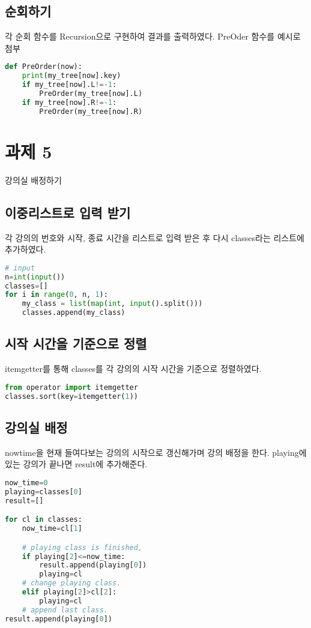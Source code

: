 \documentclass{article}
\begin{document}
	\subsection{순회하기}
	 각 순회 함수를 Recursion으로 구현하여 결과를 출력하였다.
	PreOder 함수를 예시로 첨부
	\begin{lstlisting}[language=Python]
def PreOrder(now):
	print(my_tree[now].key)
	if my_tree[now].L!=-1:
		PreOrder(my_tree[now].L)
	if my_tree[now].R!=-1:
		PreOrder(my_tree[now].R)
	\end{lstlisting}

	\section{과제 5}
	강의실 배정하기
	\subsection{이중리스트로 입력 받기}
	각 강의의 번호와 시작, 종료 시간을 리스트로 입력 받은 후 다시 classes라는 리스트에 추가하였다.
	\begin{lstlisting}[language=Python]
# input
n=int(input())
classes=[]
for i in range(0, n, 1):
	my_class = list(map(int, input().split()))
	classes.append(my_class)
	\end{lstlisting}
	\subsection{시작 시간을 기준으로 정렬}
	itemgetter를 통해 classes를 각 강의의 시작 시간을 기준으로 정렬하였다.
	\begin{lstlisting}[language=Python]
from operator import itemgetter
classes.sort(key=itemgetter(1))
	\end{lstlisting}
	\subsection{강의실 배정}
	nowtime을 현재 들여다보는 강의의 시작으로 갱신해가며 강의 배정을 한다. playing에 있는 강의가 끝나면 result에 추가해준다.
	\begin{lstlisting}[language=Python]
now_time=0
playing=classes[0]
result=[]

for cl in classes:
	now_time=cl[1]

	# playing class is finished,
	if playing[2]<=now_time:
		result.append(playing[0])
		playing=cl
	# change playing class.
	elif playing[2]>cl[2]:
		playing=cl
	# append last class.
result.append(playing[0])
	\end{lstlisting}
\end{document}
